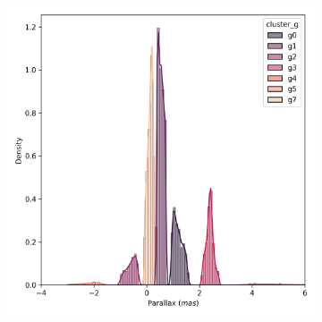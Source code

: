 \documentclass[11pt,a4paper,english,twocolumn]{article}
\begin{document}
\begin{figure}[!hbt]
\begin{subfigure}{0.3\textwidth}
  \end{subfigure}
  \begin{subfigure}{0.3\textwidth}
    \includegraphics[width=\textwidth]{../figures/ngc_2516/dec_parallax_filtered_ngc_2516.png}
  \end{subfigure}


\end{figure}
\end{document}
